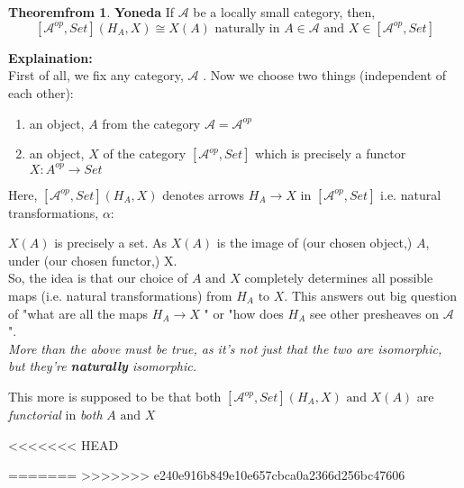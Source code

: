 \documentclass[18pt,a4paper]{extarticle}
\theoremstyle{definition}
\newtheorem{theorem}{Theoremfrom }[section]
\theoremstyle{definition}
\begin{document}
\section{}
\begin{theorem}{\textbf{Yoneda}} %
	If $\mathcal{A} $ be a locally small category, then, \\
	\[ [ \mathcal{A} ^{op},Set ](H_A,X) \cong X(A) \text{ naturally in } A \in \mathcal{A} \text{ and }
	X \in [ \mathcal{A}^{op},Set]\]
\end{theorem}
\textbf{Explaination:} \\
First of all, we fix any category, $\mathcal{A} $ . Now we choose two things (independent of each other):
\begin{enumerate}[label=\roman*]
	\item an object, $A$ from the category $ \mathcal{A}= \mathcal{A} ^{op} $
	\item an object, $X$ of the category $[ \mathcal{A}^{op},Set] $
		which is precisely a functor $X: A^{op} \rightarrow Set$
\end{enumerate}
Here, $[ \mathcal{A}^{op},Set](	H_A,X) $ denotes arrows $H_A \rightarrow X$ in $[ \mathcal{A}^{op},Set] $
i.e. natural transformations, $\alpha :$
$X(A)$ is precisely a set. As $X(A)$ is the image of (our chosen object,) $A$, under (our chosen functor,) X. \\

So, the idea is that our choice of $A \text{ and } X$ completely determines all possible maps
(i.e. natural transformations) from $H_A \text{ to } X$. This answers out big question of "what are all the maps
$H_A  \rightarrow X$ " or "how does $H_A$ see other presheaves on $\mathcal{A} $ ".\\

\textit{More than the above must be true, as it's not just that the two are isomorphic, but they're \textbf{naturally} isomorphic.}

This more is supposed to be that both $[ \mathcal{A}^{op},Set](H_A,X) \text{ and } X(A)$ are
\textit{functorial} in \textit{both} $A \text{ and } X$








<<<<<<< HEAD


=======
>>>>>>> e240e916b849e10e657cbca0a2366d256bc47606
\end{document}
